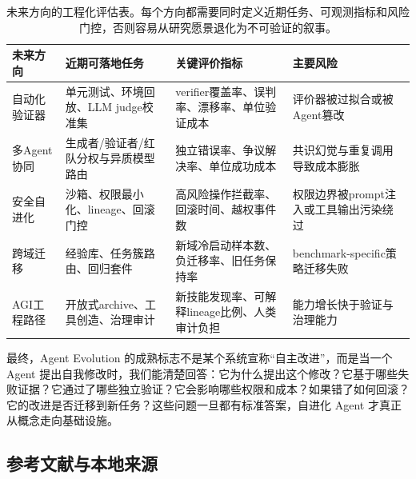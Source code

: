 \begin{table}[htbp]
\centering
\small
\begin{tabular}{p{27mm}p{34mm}p{40mm}p{38mm}}
\toprule
\textbf{未来方向} & \textbf{近期可落地任务} & \textbf{关键评价指标} & \textbf{主要风险} \\
\midrule
自动化验证器 & 单元测试、环境回放、LLM judge校准集 & verifier覆盖率、误判率、漂移率、单位验证成本 & 评价器被过拟合或被Agent篡改 \\
多Agent协同 & 生成者/验证者/红队分权与异质模型路由 & 独立错误率、争议解决率、单位成功成本 & 共识幻觉与重复调用导致成本膨胀 \\
安全自进化 & 沙箱、权限最小化、lineage、回滚门控 & 高风险操作拦截率、回滚时间、越权事件数 & 权限边界被prompt注入或工具输出污染绕过 \\
跨域迁移 & 经验库、任务簇路由、回归套件 & 新域冷启动样本数、负迁移率、旧任务保持率 & benchmark-specific策略迁移失败 \\
AGI工程路径 & 开放式archive、工具创造、治理审计 & 新技能发现率、可解释lineage比例、人类审计负担 & 能力增长快于验证与治理能力 \\
\bottomrule
\end{tabular}
\caption{未来方向的工程化评估表。每个方向都需要同时定义近期任务、可观测指标和风险门控，否则容易从研究愿景退化为不可验证的叙事。}
\label{tab:ch8-direction-metrics}
\end{table}

最终，Agent Evolution 的成熟标志不是某个系统宣称``自主改进''，而是当一个 Agent 提出自我修改时，我们能清楚回答：它为什么提出这个修改？它基于哪些失败证据？它通过了哪些独立验证？它会影响哪些权限和成本？如果错了如何回滚？它的改进是否迁移到新任务？这些问题一旦都有标准答案，自进化 Agent 才真正从概念走向基础设施。

\subsection{参考文献与本地来源}\label{sec:ch8-refs}

